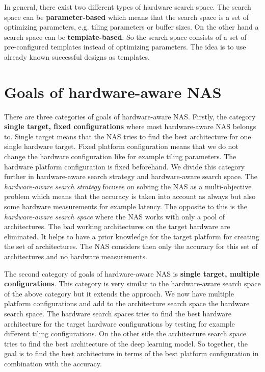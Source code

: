 \documentclass[conference]{IEEEtran}
\begin{document}
In general, there exist two different types of hardware search space. The search space can be \textbf{parameter-based} which means that the search space is a set of optimizing parameters, e.g. tiling parameters or buffer sizes. On the other hand a search space can be \textbf{template-based}. So the search space consists of a set of pre-configured templates instead of optimizing parameters. The idea is to use already known successful designs as templates.

\section{Goals of hardware-aware NAS}
\label{section:Goals}
There are three categories of goals of hardware-aware NAS. Firstly, the category \textbf{single target, fixed configurations} where most hardware-aware NAS belongs to. Single target means that the NAS tries to find the best architecture for one single hardware target. Fixed platform configuration means that we do not change the hardware configuration like for example tiling parameters. The hardware platform configuration is fixed beforehand. We divide this category further in hardware-aware search strategy and hardware-aware search space. The \textit{hardware-aware search strategy} focuses on solving the NAS as a multi-objective problem which means that the accuracy is taken into account as always but also some hardware measurements for example latency. The opposite to this is the \textit{hardware-aware search space} where the NAS works with only a pool of architectures. The bad working architectures on the target hardware are eliminated. It helps to have a prior knowledge for the target platform for creating the set of architectures. The NAS considers then only the accuracy for this set of architectures and no hardware measurements.

The second category of goals of hardware-aware NAS is \textbf{single target, multiple configurations}. This category is very similar to the hardware-aware search space of the above category but it extends the approach. We now have multiple platform configurations and add to the architecture search space the hardware search space. The hardware search spaces tries to find the best hardware architecture for the target hardware configurations by testing for example different tiling configurations. On the other side the architecture search space tries to find the best architecture of the deep learning model. So together, the goal is to find the best architecture in terms of the best platform configuration in combination with the accuracy. 
\end{document}
